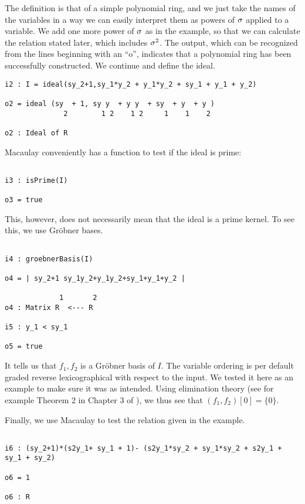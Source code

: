 The definition is that of a simple polynomial ring, and we just take the names of the variables in a way we can easily interpret them as powers of $\sigma$ applied to a variable. We add one more power of $\sigma$ as in the example, so that we can calculate the relation stated later, which includes $\sigma^2$.
The output, which can be recognized from the lines beginning with an ``o'', indicates that a polynomial ring has been successfully constructed. We continue and define the ideal.

\begin{lstlisting}
i2 : I = ideal(sy_2+1,sy_1*y_2 + y_1*y_2 + sy_1 + y_1 + y_2)

o2 = ideal (sy  + 1, sy y  + y y  + sy  + y  + y )
              2        1 2    1 2     1    1    2

o2 : Ideal of R

\end{lstlisting}

Macaulay conveniently has a function to test if the ideal is prime: 

\begin{lstlisting}

i3 : isPrime(I)

o3 = true

\end{lstlisting}

This, however, does not necessarily mean that the ideal is a prime kernel. To see this, we use Gr\"{o}bner bases.

\begin{lstlisting}

i4 : groebnerBasis(I)

o4 = | sy_2+1 sy_1y_2+y_1y_2+sy_1+y_1+y_2 |

             1       2
o4 : Matrix R  <--- R

i5 : y_1 < sy_1

o5 = true

\end{lstlisting}

It tells us that $f_1, f_2$ is a Gr\"{o}bner basis of $I$.
The variable ordering is per default graded reverse lexicographical with respect to the input.  
We tested it here as an example to make sure it was as intended.
Using elimination theory (see for example Theorem 2 in Chapter 3 of \cite{cox}),
we thus see that $(f_1,f_2)[0] = \{0\}$.

Finally, we use Macaulay to test the relation given in the example.

\begin{lstlisting}

i6 : (sy_2+1)*(s2y_1+ sy_1 + 1)- (s2y_1*sy_2 + sy_1*sy_2 + s2y_1 + sy_1 + sy_2)

o6 = 1

o6 : R


\end{lstlisting}

